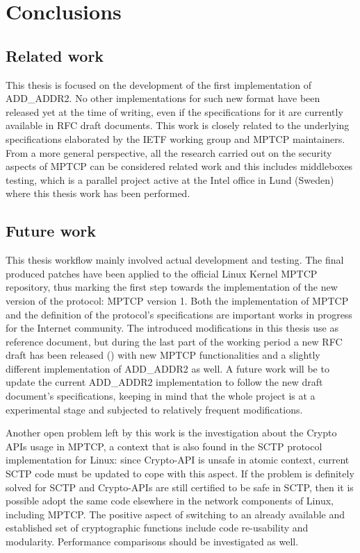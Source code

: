 \chapter{Conclusions}
\label{chap:conclusions}

\section{Related work}
This thesis is focused on the development of the first implementation of ADD\_ADDR2. No other implementations for such new format have been released yet at the time of writing, even if the specifications for it are currently available in RFC draft documents. This work is closely related to the underlying specifications elaborated by the IETF working group and MPTCP maintainers. From a more general perspective, all the research carried out on the security aspects of MPTCP can be considered related work and this includes middleboxes testing, which is a parallel project active at the Intel office in Lund (Sweden) where this thesis work has been performed. 

\section{Future work}
\label{future}
This thesis workflow mainly involved actual development and testing. The final produced patches have been applied to the official Linux Kernel MPTCP repository, thus marking the first step towards the implementation of the new version of the protocol: MPTCP version 1. 
Both the implementation of MPTCP and the definition of the protocol's specifications are important works in progress for the Internet community. The introduced modifications in this thesis use  as reference document, but during the last part of the working period a new RFC draft has been released () with new MPTCP functionalities and a slightly different implementation of ADD\_ADDR2 as well. A future work will be to update the current ADD\_ADDR2 implementation to follow the new draft document's specifications, keeping in mind that the whole project is at a experimental stage and subjected to relatively frequent modifications.

Another open problem left by this work is the investigation about the Crypto APIs usage in MPTCP, a context that is also found in the SCTP protocol implementation for Linux: since Crypto-API is unsafe in atomic context, current SCTP code must be updated to cope with this aspect. If the problem is definitely solved for SCTP and Crypto-APIs are still certified to be safe in SCTP, then it is possible adopt the same code elsewhere in the network components of Linux, including MPTCP. The positive aspect of switching to an already available and established set of cryptographic functions include code re-usability and modularity. Performance comparisons should be investigated as well.

